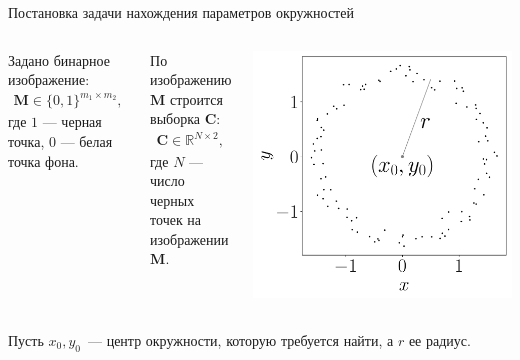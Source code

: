 \documentclass[9pt,pdf,hyperref={unicode}]{beamer}
\begin{document}
\begin{frame}[shrink=5]{Постановка задачи нахождения параметров окружностей}
\justifying
\begin{columns}
Задано бинарное изображение:
\begin{equation*}
\begin{aligned}
\textbf{M} \in \{0,1\}^{m_1 \times m_2},
\end{aligned}
\end{equation*}
где $1$ --- черная точка, $0$ --- белая точка фона.

По изображению $\textbf{M}$ строится выборка $\textbf{C}$:
\begin{equation*}
\begin{aligned}
\textbf{C} \in  \mathbb{R}^{N \times 2},
\end{aligned}
\end{equation*}
где $N$ --- число черных точек на изображении $\textbf{M}$.
\begin{center}
	\includegraphics[height=0.4\textheight]{result/slides_statment}
\end{center}
\end{columns}


Пусть $x_0, y_0$~--- центр окружности, которую требуется найти, а $r$ ее радиус.


\end{frame}
\end{document}
